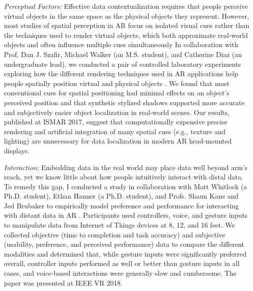 \documentclass[11pt]{article}
\begin{document}
\emph{Perceptual Factors: }Effective data contextualization requires that people perceive virtual objects in the same space as the physical objects they represent. However, most studies of spatial perception in AR focus on isolated visual cues rather than the techniques used to render virtual objects, which both approximate real-world objects and often influence multiple cues simultaneously 
In collaboration with Prof. Dan J. Szafir, Michael Walker (an M.S. student), and Catherine Diaz (an undergraduate lead), we conducted a pair of controlled laboratory experiments exploring how the different rendering techniques used in AR applications 
help people spatially position virtual and physical objects
\cite{diaz2017designing}.  
We found that most conventional cues for spatial positioning had minimal effects on an object's perceived position and that synthetic stylized shadows supported more accurate and subjectively easier object localization in real-world scenes. Our results, published at ISMAR 2017,
 suggest that computationally expensive precise rendering and artificial integration of many spatial cues (e.g., texture and lighting) are unnecessary for data localization in modern AR head-mounted displays. 
 
\emph{Interaction: }Embedding data in the real world may place data well beyond arm's reach, yet we know little about how people intuitively interact with distal data.
To remedy this gap, I conducted a study in collaboration with Matt Whitlock (a Ph.D. student), Ethan Hanner (a Ph.D. student), and Profs. Shaun Kane and Jed Brubaker to empirically model preference and performance for interacting with distant data in AR \cite{whitlock2018Distal}. Participants used controllers, voice, and gesture inputs to manipulate data from Internet of Things devices at 8, 12, and 16 feet. We collected objective (time to completion and task accuracy) and subjective (usability, preference, and perceived performance) data to compare the different modalities and determined that, while gesture inputs were significantly preferred overall, controller inputs performed as well or better than gesture inputs in all cases, and voice-based interactions were generally slow and cumbersome. The paper was presented at IEEE VR 2018. 
\end{document}
